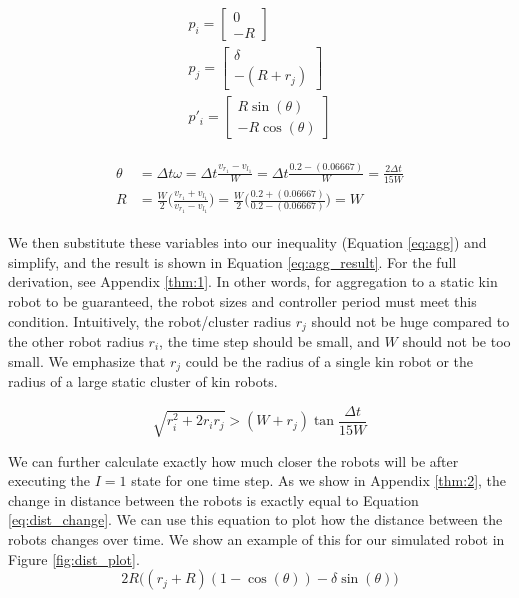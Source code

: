\documentclass[conference]{IEEEtran}
\begin{document}
    \begin{equation} \label{eq:vars}
      \begin{split}
        p_i = \begin{bmatrix}0 \\ -R\end{bmatrix} \\
        p_j = \begin{bmatrix}\delta \\ -(R+r_j)\end{bmatrix} \\
        p'_i = \begin{bmatrix}R\sin(\theta) \\ -R\cos(\theta)\end{bmatrix}
      \end{split}
    \end{equation}

    \begin{align}
      \begin{split} \label{eq:theta_and_r}
        \theta &= \Delta t\omega = \Delta t \frac{v_{r_1} - v_{l_1}}{W} = \Delta t \frac{0.2 - (0.06667)}{W} = \frac{2\Delta t}{15W} \\
        R &= \frac{W}{2}\bigg(\frac{v_{r_1} + v_{l_1}}{v_{r_1} - v_{l_1}}\bigg) = \frac{W}{2}\bigg(\frac{0.2 + (0.06667)}{0.2 - (0.06667)}\bigg) = W
      \end{split}
    \end{align}

    We then substitute these variables into our inequality (Equation \ref{eq:agg}) and simplify, and the result is shown in Equation \ref{eq:agg_result}. For the full derivation, see Appendix \ref{thm:1}. In other words, for aggregation to a static kin robot to be guaranteed, the robot sizes and controller period must meet this condition. Intuitively, the robot/cluster radius $r_j$ should not be huge compared to the other robot radius $r_i$, the time step should be small, and $W$ should not be too small. We emphasize that $r_j$ could be the radius of a single kin robot or the radius of a large static cluster of kin robots.

    \begin{equation} \label{eq:agg_result}
      \sqrt{r^2_i + 2r_ir_j} > (W+r_j)\tan{\frac{\Delta t}{15W}}
    \end{equation}

    We can further calculate exactly how much closer the robots will be after executing the $I=1$ state for one time step. As we show in Appendix \ref{thm:2}, the change in distance between the robots is exactly equal to Equation \ref{eq:dist_change}. We can use this equation to plot how the distance between the robots changes over time. We show an example of this for our simulated robot in Figure \ref{fig:dist_plot}.
    \begin{equation} \label{eq:dist_change}
      2R\big((r_j + R)(1 - \cos(\theta))-\delta\sin(\theta)\big)
    \end{equation}
\end{document}
